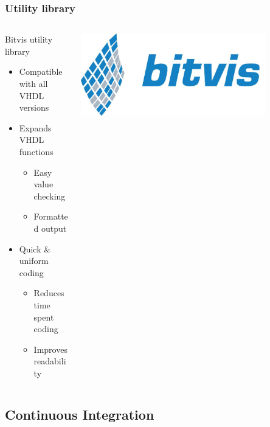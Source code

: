 \documentclass[british,10pt]{beamer}
\begin{document}
\begin{frame}\frametitle{Utility library}
\begin{columns}
\begin{column}{0.6\textwidth}
Bitvis utility library
\begin{itemize}
\item Compatible with all VHDL versions
\item Expands VHDL functions
\begin{itemize}
\item Easy value checking
\item Formatted output
\end{itemize}
\item Quick \& uniform coding
\begin{itemize}
\item Reduces time spent coding
\item Improves readability
\end{itemize}
\end{itemize}
\end{column}
\includegraphics[width=0.8\textwidth]{images/bitvis.png}
\end{columns}
\end{frame}

\subsection{Continuous Integration}
\end{document}
